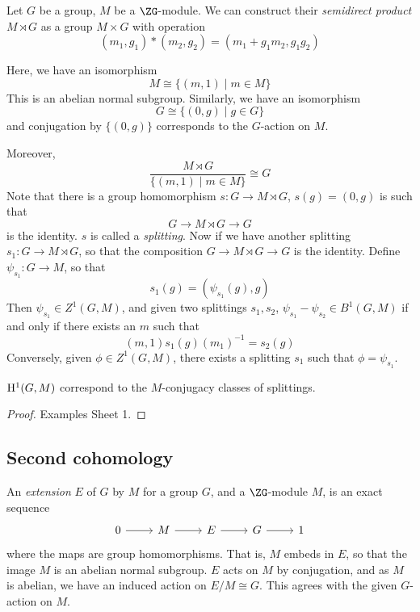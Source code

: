 \documentclass{article}
\begin{document}
\begin{definition}
    Let \(G\) be a group, \(M\) be a \(\ZG\)-module. We can construct their \emph{semidirect product} \(M \rtimes G\) as a group \(M \times G\) with operation
    \[(m_1, g_1) * (m_2, g_2) = (m_1 + g_1m_2, g_1g_2)\]
\end{definition}
Here, we have an isomorphism 
\[M \cong \{(m, 1) \mid m \in M\}\]
This is an abelian normal subgroup. Similarly, we have an isomorphism
\[G \cong \{(0, g) \mid g \in G\}\]
and conjugation by \(\{(0, g)\}\) corresponds to the \(G\)-action on \(M\).

Moreover,
\[\frac{M \rtimes G}{\{(m, 1) \mid m \in M\}} \cong G\]
Note that there is a group homomorphism \(s : G \to M \rtimes G\), \(s(g) = (0, g)\) is such that
\[G \to M \rtimes G \to G\]
is the identity. \(s\) is called a \emph{splitting}. Now if we have another splitting \(s_1 : G \to M \rtimes G\), so that the composition \(G \to M \rtimes G \to G\) is the identity. Define \(\psi_{s_1} : G \to M\), so that
\[s_1(g) = (\psi_{s_1}(g), g)\]
Then \(\psi_{s_1} \in Z^1(G, M)\), and given two splittings \(s_1, s_2\), \(\psi_{s_1} - \psi_{s_2} \in B^1(G, M)\) if and only if there exists an \(m\) such that
\[(m, 1)s_1(g)(m_1)^{-1} = s_2(g)\]
Conversely, given \(\phi \in Z^1(G, M)\), there exists a splitting \(s_1\) such that \(\phi = \psi_{s_1}\).

\begin{theorem}
    \(\mathrm{H}^1(G, M)\) correspond to the \(M\)-conjugacy classes of splittings.
\end{theorem}

\begin{proof}
    Examples Sheet 1.
\end{proof}

\subsection{Second cohomology}

\begin{definition}
    [extension] An \emph{extension} \(E\) of \(G\) by \(M\) for a group \(G\), and a \(\ZG\)-module \(M\), is an exact sequence
\[\begin{tikzcd}
	0 & M & E & G & 1
	\arrow[from=1-1, to=1-2]
	\arrow[from=1-2, to=1-3]
	\arrow[from=1-3, to=1-4]
	\arrow[from=1-4, to=1-5]
\end{tikzcd}\]
    where the maps are group homomorphisms. That is, \(M\) embeds in \(E\), so that the image \(M\) is an abelian normal subgroup. \(E\) acts on \(M\) by conjugation, and as \(M\) is abelian, we have an induced action on \(E/M \cong G\). This agrees with the given \(G\)-action on \(M\).
\end{definition}
\end{document}
